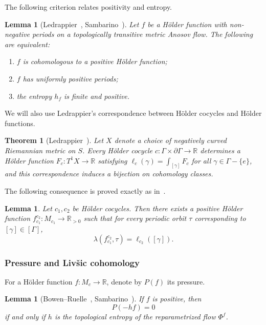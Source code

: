 \documentclass[12pt]{amsart}
\numberwithin{equation}{section}
\numberwithin{figure}{section}
\newtheorem{theorem}[equation]{Theorem}
\newtheorem{lemma}[equation]{Lemma}
\theoremstyle{definition}
\theoremstyle{plain}
\begin{document}
The following criterion relates positivity and entropy.

\begin{lemma}[Ledrappier~\cite{ledrappier1994structure}, Sambarino~\cite{Sambarino2014}]
\label{lem:PosEntropy}
Let $f$ be a H\"older function with non-negative periods on a topologically transitive metric Anosov flow. The following are equivalent:
\begin{enumerate}
    \item $f$ is cohomologous to a positive H\"older function;
    \item $f$ has uniformly positive periods;
    \item the entropy $h_f$ is finite and positive.
\end{enumerate}
\end{lemma}

We will also use Ledrappier's correspondence between H\"older cocycles and H\"older functions.

\begin{theorem}[Ledrappier~\cite{ledrappier1994structure}]
\label{thm:Ledrappier}
Let $X$ denote a choice of negatively curved Riemannian metric on $S$.
Every H\"older cocycle $c:\Gamma\times\partial\Gamma\to\mathbb R$
determines a H\"older function $F_c:T^1X\to\mathbb R$
satisfying
$\ell_c(\gamma)=\int_{[\gamma]}F_c$
for all $\gamma\in\Gamma-\{e\}$, and this correspondence induces a bijection on cohomology classes.
\end{theorem}

The following consequence is proved exactly as in~\cite[Proposition~6.11]{DM23:Correlation}.

\begin{lemma}
\label{lem: rep}
Let $c_1,c_2$ be H\"older cocycles. Then there exists a positive H\"older function
$f_{c_1}^{c_2}:M_{c_1}\to\mathbb R_{>0}$
such that for every periodic orbit $\tau$ corresponding to $[\gamma]\in[\Gamma]$,
\[\lambda(f_{c_1}^{c_2},\tau)
=
\ell_{c_2}([\gamma]).\]
\end{lemma}

\subsubsection{Pressure and Liv\v{s}ic cohomology}

For a H\"older function $f:M_c\to\mathbb R$, denote by $P(f)$ its pressure.

\begin{lemma}[Bowen--Ruelle~\cite{BR75:AxiomA}, Sambarino~\cite{Sambarino2014}]
\label{lem:PressueZero}
If $f$ is positive, then
\[
P(-hf)=0
\]
if and only if $h$ is the topological entropy of the reparametrized flow $\Phi^f$.
\end{lemma}
\end{document}
